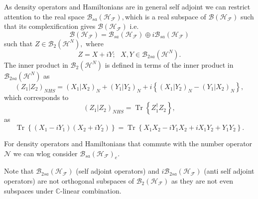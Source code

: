 \documentclass[aps,preprint]{revtex4}%
\begin{document}
As density operators and Hamiltonians are in general self adjoint we can
restrict attention to the real space $\mathcal{B}_{sa}\left(  \mathcal{H}%
_{\mathcal{F}}\right)  ,$which is a real subspace of $\mathcal{B}\left(
\mathcal{H}_{\mathcal{F}}\right)  $ such that its complexification gives
$\mathcal{B}\left(  \mathcal{H}_{\mathcal{F}}\right)  $ i.e.
\begin{equation}
\mathcal{B}\left(  \mathcal{H}_{\mathcal{F}}\right)  =\mathcal{B}_{sa}\left(
\mathcal{H}_{\mathcal{F}}\right)  \oplus i\mathcal{B}_{sa}\left(
\mathcal{H}_{\mathcal{F}}\right)
\end{equation}
such that $Z\in\mathcal{B}_{2}\left(  \mathcal{H}^{N}\right)  ,$ where
\begin{equation}
Z=X+iY;\text{ }X,Y\in\mathcal{B}_{2sa}\left(  \mathcal{H}^{N}\right)  .
\end{equation}
The inner product in $\mathcal{B}_{2}\left(  \mathcal{H}^{N}\right)  $ is
defined in terms of the inner product in $\mathcal{B}_{2sa}\left(
\mathcal{H}^{N}\right)  $ as
\begin{equation}
\left(  Z_{1}\left\vert Z_{2}\right.  \right)  _{NHS}=\left(  X_{1}\left\vert
X_{2}\right.  \right)  _{N}+\left(  Y_{1}\left\vert Y_{2}\right.  \right)
_{N}+i\left\{  \left(  X_{1}\left\vert Y_{2}\right.  \right)  _{N}-\left(
Y_{1}\left\vert X_{2}\right.  \right)  _{N}\right\}  ,
\end{equation}
which corresponds to
\begin{equation}
\left(  Z_{1}\left\vert Z_{2}\right.  \right)  _{NHS}=\operatorname{Tr}%
\left\{  Z_{1}^{\dagger}Z_{2}\right\}  ,
\end{equation}
as%
\begin{equation}
\operatorname{Tr}\left\{  \left(  X_{1}-iY_{1}\right)  \left(  X_{2}%
+iY_{2}\right)  \right\}  =\operatorname{Tr}\left\{  X_{1}X_{2}-iY_{1}%
X_{2}+iX_{1}Y_{2}+Y_{1}Y_{2}\right\}  .
\end{equation}


For density operators and Hamiltonians that commute with the number operator
$\mathcal{N}$ we can wlog consider $\mathcal{B}_{sa}\left(  \mathcal{H}%
_{\mathcal{F}}\right)  _{e}.$

Note that $\mathcal{B}_{2sa}\left(  \mathcal{H}_{\mathcal{F}}\right)  $ (self
adjoint operators) and $i\mathcal{B}_{2sa}\left(  \mathcal{H}_{\mathcal{F}%
}\right)  $ (anti self adjoint operators) are not orthogonal subspaces of
$\mathcal{B}_{2}\left(  \mathcal{H}_{\mathcal{F}}\right)  $ as they are not
even subspaces under $\mathbb{C}$-linear combination.
\end{document}

